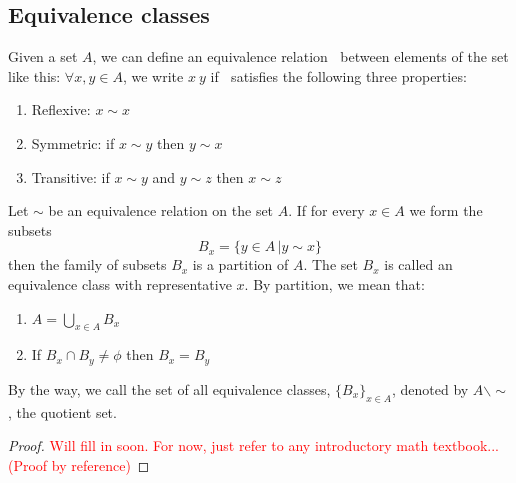       \subsection*{Equivalence classes}
      Given a set $A$, we can define an equivalence relation $~$ between
      elements of the set like this: $\forall x,y \in A$, we write $x~y$ if
      $~$ satisfies the following three properties:
      \begin{enumerate}
        \item{Reflexive: $x\sim x$}
        \item{Symmetric: if $x\sim y$ then $y\sim x$}
        \item{Transitive: if $x\sim y$ and $y\sim z$ then $x\sim z$}
      \end{enumerate}
      \begin{theorem}
        Let $\sim$ be an equivalence relation on the set $A$. If for every $x
        \in A$ we form the subsets \[B_x = \{y\in A \,|y\sim x\}\] then the
        family of subsets $B_x$ is a partition of $A$. The set $B_x$ is
        called an equivalence class with representative $x$. By partition, we
        mean that:
        \begin{enumerate}
          \item{$A = \bigcup\limits_{x\in A} B_x$}
          \item{If $B_x \cap B_y \neq \phi$ then $B_x = B_y$}
        \end{enumerate}
      \end{theorem}
      \begin{remark}
        By the way, we call the set of all equivalence classes,
        $\{B_x\}_{x\in A}$, denoted by $A\backslash \sim$, the quotient set.
      \end{remark}
      \begin{proof}
        \textcolor{red}{Will fill in soon. For now, just refer to any
        introductory math textbook... (Proof by reference)}
      \end{proof}
